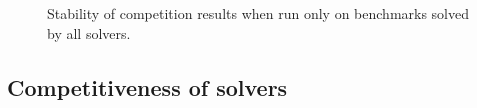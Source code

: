 \documentclass[smallcondensed]{svjour3}
\begin{document}
%


\begin{figure}
\centering
\begin{tabular}{|lrr|rr|}
\hline

\end{tabular}
\caption{Stability of competition results when run only on benchmarks solved by all solvers.}
\label{Fig:virtual-competition-solved-some}
\end{figure}

\subsection{Competitiveness of solvers}
\label{Competitiveness}
\end{document}
